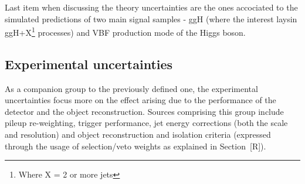 \hspace{10pt} Last item when discussing the theory uncertainties are the ones accociated to the simulated predictions of two main signal samples - ggH (where the interest laysin ggH+X\footnote{Where X = 2 or more jets} processes) and VBF production mode of the Higgs boson.
 
\subsection{Experimental uncertainties}
\hspace{10pt} As a companion group to the previously defined one, the experimental uncertainties focus more on the effect arising due to the performance of the detector and the object reconstruction. Sources comprising this group include pileup re-weighting, trigger performance, jet energy corrections (both the scale and resolution) and object reconstruction and isolation criteria (expressed through the usage of selection/veto weights as explained in Section~[R]).


